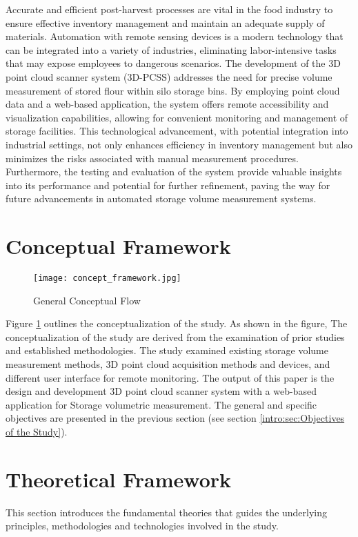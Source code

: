 Accurate and efficient post-harvest processes are vital in the food industry to ensure effective inventory management and maintain an adequate supply of materials. Automation with remote sensing devices is a modern technology that can be integrated into a variety of industries, eliminating labor-intensive tasks that may expose employees to dangerous scenarios. The development of the 3D point cloud scanner system (3D-PCSS) addresses the need for precise volume measurement of stored flour within silo storage bins. By employing point cloud data and a web-based application, the system offers remote accessibility and visualization capabilities, allowing for convenient monitoring and management of storage facilities. This technological advancement, with potential integration into industrial settings, not only enhances efficiency in inventory management but also minimizes the risks associated with manual measurement procedures. Furthermore, the testing and evaluation of the system provide valuable insights into its performance and potential for further refinement, paving the way for future advancements in automated storage volume measurement systems.

\section{Conceptual Framework}
\label{intro:sec:Conceptual Framework}

\begin{figure}[H]
	\centering
	\texttt{[image: concept\_framework.jpg]}
	\caption{General Conceptual Flow}
	\label{fig:conceptual-framework}
\end{figure}

Figure \ref{intro:sec:Conceptual Framework} outlines the conceptualization of the study. As shown in the figure, The conceptualization of the study are derived from the examination of prior studies and established methodologies. The study examined existing storage volume measurement methods, 3D point cloud acquisition methods and devices, and different user interface for remote monitoring. The output of this paper is the design and development 3D point cloud scanner system with a web-based application for Storage volumetric measurement. The general and specific objectives are presented in the previous section (see section \ref{intro:sec:Objectives of the Study}).

\section{Theoretical Framework}
\label{intro:sec:Theoretical Framework}
This section introduces the fundamental theories that guides the underlying principles, methodologies and technologies involved in the study.

